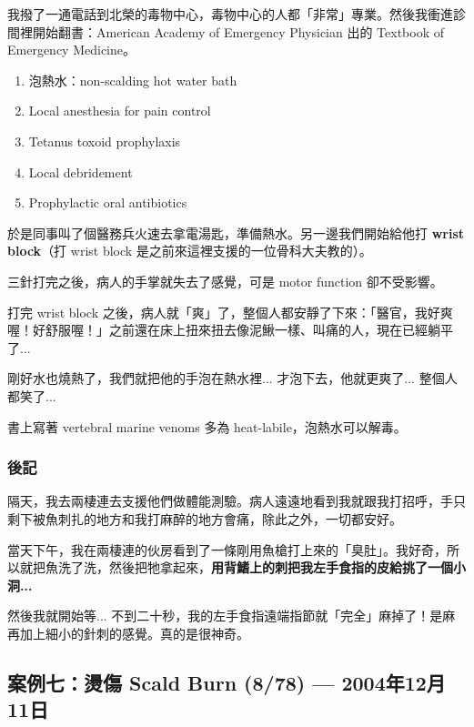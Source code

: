 \documentclass[12pt,a4paper]{article}
\begin{document}
我撥了一通電話到北榮的毒物中心，毒物中心的人都「非常」專業。然後我衝進診間裡開始翻書：American Academy of Emergency Physician 出的 Textbook of Emergency Medicine。

\begin{tcolorbox}[
    colback=highlight_yellow,
    colframe=emergency_blue,
    title=\textbf{FISH STING 處置},
    fonttitle=\bfseries
]
\begin{enumerate}
    \item 泡熱水：non-scalding hot water bath
    \item Local anesthesia for pain control
    \item Tetanus toxoid prophylaxis
    \item Local debridement
    \item Prophylactic oral antibiotics
\end{enumerate}
\end{tcolorbox}

於是同事叫了個醫務兵火速去拿電湯匙，準備熱水。另一邊我們開始給他打 \textbf{wrist block}（打 wrist block 是之前來這裡支援的一位骨科大夫教的）。

三針打完之後，病人的手掌就失去了感覺，可是 motor function 卻不受影響。

打完 wrist block 之後，病人就「爽」了，整個人都安靜了下來：「醫官，我好爽喔！好舒服喔！」之前還在床上扭來扭去像泥鰍一樣、叫痛的人，現在已經躺平了...

剛好水也燒熱了，我們就把他的手泡在熱水裡... 才泡下去，他就更爽了... 整個人都笑了...

書上寫著 vertebral marine venoms 多為 heat-labile，泡熱水可以解毒。

\subsubsection{後記}

隔天，我去兩棲連去支援他們做體能測驗。病人遠遠地看到我就跟我打招呼，手只剩下被魚刺扎的地方和我打麻醉的地方會痛，除此之外，一切都安好。

當天下午，我在兩棲連的伙房看到了一條剛用魚槍打上來的「臭肚」。我好奇，所以就把魚洗了洗，然後把牠拿起來，\textbf{用背鰭上的刺把我左手食指的皮給挑了一個小洞...}

然後我就開始等... 不到二十秒，我的左手食指遠端指節就「完全」麻掉了！是麻再加上細小的針刺的感覺。真的是很神奇。

\subsection{案例七：燙傷 Scald Burn (8/78) — 2004年12月11日}
\end{document}
